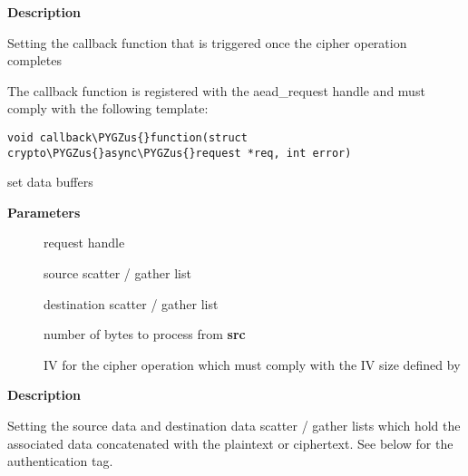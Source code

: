 \documentclass[a4paper,8pt,english]{sphinxmanual}
\def\PYGZus{\char`\_}
\begin{document}
\textbf{Description}

Setting the callback function that is triggered once the cipher operation
completes

The callback function is registered with the aead\_request handle and
must comply with the following template:

\begin{Verbatim}[commandchars=\\\{\}]
void callback\PYGZus{}function(struct crypto\PYGZus{}async\PYGZus{}request *req, int error)
\end{Verbatim}

\begin{fulllineitems}
\label{crypto/api-aead:c.aead_request_set_crypt}
set data buffers

\end{fulllineitems}


\textbf{Parameters}
\begin{description}
\item[{}] \leavevmode
request handle

\item[{}] \leavevmode
source scatter / gather list

\item[{}] \leavevmode
destination scatter / gather list

\item[{}] \leavevmode
number of bytes to process from \textbf{src}

\item[{}] \leavevmode
IV for the cipher operation which must comply with the IV size defined
by {\hyperref[crypto/api\string-aead:c.crypto_aead_ivsize]{}}

\end{description}

\textbf{Description}

Setting the source data and destination data scatter / gather lists which
hold the associated data concatenated with the plaintext or ciphertext. See
below for the authentication tag.
\end{document}
